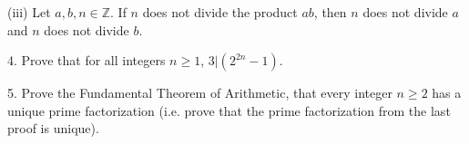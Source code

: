 \documentclass{article}
\theoremstyle{remark} %
\newcommand{\R}{{\mathbb{R}}}
\newcommand{\Z}{{\mathbb{Z}}}
\newcommand{\N}{{\mathbb{N}}}
\begin{document}
\vspace{7cm} %




(iii) Let $a,b,n \in \Z$. If $n$ does not divide the product $ab$, then $n$ does not divide $a$ and $n$ does not divide $b$.

\vspace{7cm} %




4. Prove that for all integers $n \geq 1$, $3|(2^{2n}-1)$.

\vspace{12cm} %




5. Prove the Fundamental Theorem of Arithmetic, that every integer $n \geq 2$ has a unique prime factorization (i.e. prove that the prime factorization from the last proof is unique).

\vspace{13cm} %







\end{document}
